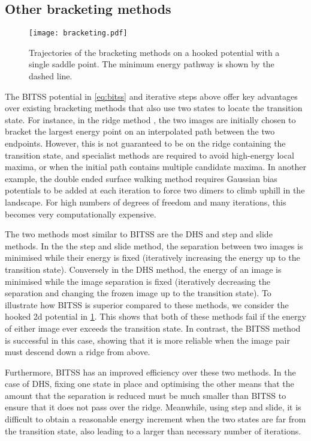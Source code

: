 \documentclass[twocolumn,10pt]{revtex4}
\begin{document}
\subsection{Other bracketing methods}
\begin{figure}[htb]
  \texttt{[image: bracketing.pdf]}
  \caption{\label{fig:bracketing}
    Trajectories of the bracketing methods on a hooked potential with a single saddle point.
    The minimum energy pathway is shown by the dashed line.
  }
\end{figure}
The BITSS potential in \cref{eq:bitss} and iterative steps above offer key advantages over existing bracketing methods that also use two states to locate the transition state.
For instance, in the ridge method \cite{Ionova1993}, the two images are initially chosen to bracket the largest energy point on an interpolated path between the two endpoints.
However, this is not guaranteed to be on the ridge containing the transition state, and specialist methods are required to avoid high-energy local maxima, or when the initial path contains multiple candidate maxima.
In another example, the double ended surface walking method \cite{Zhang2013} requires Gaussian bias potentials to be added at each iteration to force two dimers to climb uphill in the landscape.
For high numbers of degrees of freedom and many iterations, this becomes very computationally expensive.

The two methods most similar to BITSS are the DHS and step and slide methods.
In the the step and slide method, the separation between two images is minimised while their energy is fixed (iteratively increasing the energy up to the transition state).
Conversely in the DHS method, the energy of an image is minimised while the image separation is fixed (iteratively decreasing the separation and changing the frozen image up to the transition state).
To illustrate how BITSS is superior compared to these methods, we consider the hooked 2d potential in \cref{fig:bracketing}.
This shows that both of these methods fail if the energy of either image ever exceeds the transition state.
In contrast, the BITSS method is successful in this case, showing that it is more reliable when the image pair must descend down a ridge from above.

Furthermore, BITSS has an improved efficiency over these two methods.
In the case of DHS, fixing one state in place and optimising the other means that the amount that the separation is reduced must be much smaller than BITSS to ensure that it does not pass over the ridge.
Meanwhile, using step and slide, it is difficult to obtain a reasonable energy increment when the two states are far from the transition state, also leading to a larger than necessary number of iterations.
\end{document}
